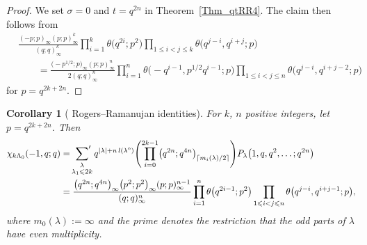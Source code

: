 \documentclass[pdftex]{sigma}
\numberwithin{equation}{section}
\newtheorem{Corollary}[Theorem]{Corollary}
\renewcommand{\leq}{\leqslant}
\newcommand{\ceil}[1]{\lceil#1\rceil}
\newcommand{\abs}[1]{\vert#1\vert}
\newcommand{\la}{\lambda}
\newcommand{\La}{\Lambda}
\begin{document}
\begin{proof}
We set $\sigma=0$ and $t=q^{2n}$ in Theorem~\ref{Thm_qtRR4}.
The claim then follows from
\begin{align*}
&\frac{(-p;p)_{\infty}(p;p)_{\infty}^k}
{(q;q)_{\infty}^k}
\prod_{i=1}^k \theta\bigl(q^{2i};p^2\bigr)
\prod_{1\leq i<j\leq k}\theta\bigl(q^{j-i},q^{i+j};p\bigr) \\
&\qquad=
\frac{\bigl(-p^{1/2};p\bigr)_{\infty}(p;p)_{\infty}^n}{2(q;q)_{\infty}^n}
\prod_{i=1}^n \theta\bigl({-}q^{i-1},p^{1/2}q^{i-1};p\bigr)
\prod_{1\leq i<j\leq n}\theta\bigl(q^{j-i},q^{i+j-2};p\bigr)
\end{align*}
for $p=q^{2k+2n}$.
\end{proof}

\begin{Corollary}[ Rogers--Ramanujan identities]
\label{Cor_18}
For $k$, $n$ positive integers, let $p=q^{2k+2n}$.
Then
\begin{align}
\chi_{k\La_0}(-1,q;q)&=
\sideset{}{'}\sum_{\substack{\la \\[1pt] \la_1\leq 2k}}
q^{\abs{\la}+n\,l(\la^{\textup{o}})}
\Biggl(\prod_{i=0}^{2k-1}\bigl(q^{2n};q^{4n}\bigr)_{\ceil{m_i(\la)/2}}\Biggr)
P_{\la}\bigl(1,q,q^2,\dots;q^{2n}\bigr) \label{Eq_GOW10}\\
&=\frac{\bigl(q^{2n};q^{4n}\bigr)_{\infty}\bigl(p^2;p^2\bigr)_{\infty}(p;p)_{\infty}^{n-1}}
{(q;q)_{\infty}^n} \prod_{i=1}^n \theta\bigl(q^{2i-1};p^2\bigr)
\prod_{1\leq i<j\leq n}\theta\bigl(q^{j-i},q^{i+j-1};p\bigr),
\notag
\end{align}
where $m_0(\la):=\infty$ and the prime denotes the restriction that
the odd parts of $\la$ have even multiplicity.
\end{Corollary}
\end{document}
